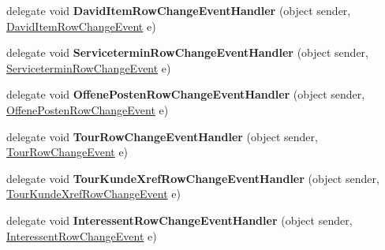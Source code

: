 \begin{DoxyCompactItemize}
\item 
delegate void {\bfseries David\+Item\+Row\+Change\+Event\+Handler} (object sender, \hyperlink{class_products_1_1_data_1_1ds_sage_1_1_david_item_row_change_event}{David\+Item\+Row\+Change\+Event} e)\hypertarget{class_products_1_1_data_1_1ds_sage_a507ee21be28b13f46c765773ed969f9f}{}\label{class_products_1_1_data_1_1ds_sage_a507ee21be28b13f46c765773ed969f9f}

\item 
delegate void {\bfseries Servicetermin\+Row\+Change\+Event\+Handler} (object sender, \hyperlink{class_products_1_1_data_1_1ds_sage_1_1_servicetermin_row_change_event}{Servicetermin\+Row\+Change\+Event} e)\hypertarget{class_products_1_1_data_1_1ds_sage_a0baed5f262859d1b0aa2606f8e07f09f}{}\label{class_products_1_1_data_1_1ds_sage_a0baed5f262859d1b0aa2606f8e07f09f}

\item 
delegate void {\bfseries Offene\+Posten\+Row\+Change\+Event\+Handler} (object sender, \hyperlink{class_products_1_1_data_1_1ds_sage_1_1_offene_posten_row_change_event}{Offene\+Posten\+Row\+Change\+Event} e)\hypertarget{class_products_1_1_data_1_1ds_sage_ac94f6546187eb30d396c669a63fbc67e}{}\label{class_products_1_1_data_1_1ds_sage_ac94f6546187eb30d396c669a63fbc67e}

\item 
delegate void {\bfseries Tour\+Row\+Change\+Event\+Handler} (object sender, \hyperlink{class_products_1_1_data_1_1ds_sage_1_1_tour_row_change_event}{Tour\+Row\+Change\+Event} e)\hypertarget{class_products_1_1_data_1_1ds_sage_af7ae59f85c9930c3752912d93abfd62c}{}\label{class_products_1_1_data_1_1ds_sage_af7ae59f85c9930c3752912d93abfd62c}

\item 
delegate void {\bfseries Tour\+Kunde\+Xref\+Row\+Change\+Event\+Handler} (object sender, \hyperlink{class_products_1_1_data_1_1ds_sage_1_1_tour_kunde_xref_row_change_event}{Tour\+Kunde\+Xref\+Row\+Change\+Event} e)\hypertarget{class_products_1_1_data_1_1ds_sage_a6940df22b9b84924bece92659fb3baa5}{}\label{class_products_1_1_data_1_1ds_sage_a6940df22b9b84924bece92659fb3baa5}

\item 
delegate void {\bfseries Interessent\+Row\+Change\+Event\+Handler} (object sender, \hyperlink{class_products_1_1_data_1_1ds_sage_1_1_interessent_row_change_event}{Interessent\+Row\+Change\+Event} e)\hypertarget{class_products_1_1_data_1_1ds_sage_ab12e9e463d2a67d56481064896578e45}{}\label{class_products_1_1_data_1_1ds_sage_ab12e9e463d2a67d56481064896578e45}


\end{DoxyCompactItemize}
